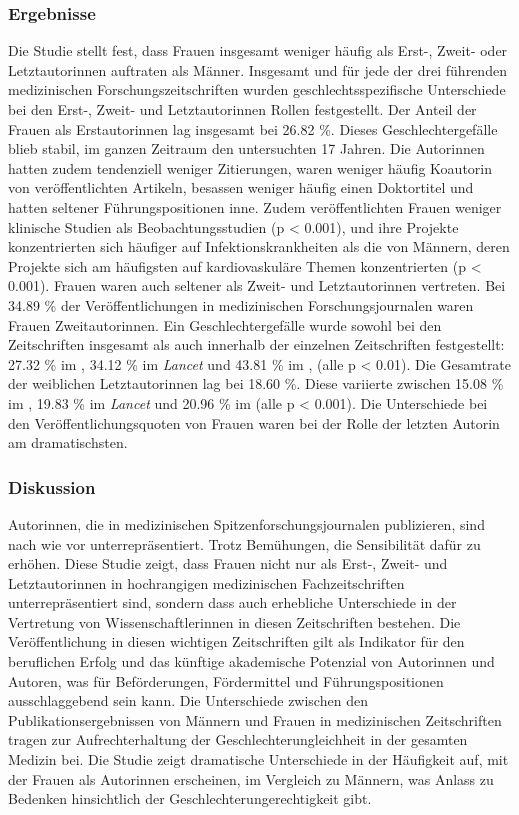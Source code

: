 \subsubsection{Ergebnisse}
Die Studie stellt fest, dass Frauen insgesamt weniger häufig als Erst-, Zweit- oder Letztautorinnen auftraten als Männer. 
Insgesamt und für jede der drei führenden medizinischen Forschungszeitschriften wurden geschlechtsspezifische Unterschiede 
bei den Erst-, Zweit- und Letztautorinnen Rollen festgestellt. 
Der Anteil der Frauen als Erstautorinnen lag insgesamt bei 26.82 \%.
Dieses Geschlechtergefälle blieb stabil, im ganzen Zeitraum den untersuchten 17 Jahren. 
Die Autorinnen hatten zudem tendenziell weniger Zitierungen, waren weniger häufig Koautorin von veröffentlichten Artikeln, 
besassen weniger häufig einen Doktortitel und hatten seltener Führungspositionen inne.
Zudem veröffentlichten Frauen weniger klinische Studien als Beobachtungsstudien (p < 0.001), und ihre Projekte konzentrierten 
sich häufiger auf Infektionskrankheiten als die von Männern, deren Projekte sich am häufigsten auf kardiovaskuläre Themen konzentrierten (p < 0.001).
Frauen waren auch seltener als Zweit- und Letztautorinnen vertreten. 
Bei 34.89 \% der Veröffentlichungen in medizinischen Forschungsjournalen waren Frauen Zweitautorinnen. 
Ein Geschlechtergefälle wurde sowohl bei den Zeitschriften insgesamt als auch innerhalb der einzelnen 
Zeitschriften festgestellt: 27.32 \% im , 34.12 \% im \textsl{Lancet} und 43.81 \% im , (alle p < 0.01).
Die Gesamtrate der weiblichen Letztautorinnen lag bei 18.60 \%.
Diese variierte zwischen 15.08 \% im , 19.83 \% im \textsl{Lancet} und 20.96 \% im  (alle p < 0.001). 
Die Unterschiede bei den Veröffentlichungsquoten von Frauen waren bei der Rolle der letzten Autorin am dramatischsten.


\subsubsection{Diskussion}
Autorinnen, die in medizinischen Spitzenforschungsjournalen publizieren, sind nach wie vor unterrepräsentiert. 
Trotz Bemühungen, die Sensibilität dafür zu erhöhen. 
Diese Studie zeigt, dass Frauen nicht nur als Erst-, Zweit- und Letztautorinnen in hochrangigen medizinischen Fachzeitschriften 
unterrepräsentiert sind, sondern dass auch erhebliche Unterschiede in der Vertretung von Wissenschaftlerinnen in diesen Zeitschriften bestehen. 
Die Veröffentlichung in diesen wichtigen Zeitschriften gilt als Indikator für den beruflichen Erfolg und das künftige akademische Potenzial 
von Autorinnen und Autoren, was für Beförderungen, Fördermittel und Führungspositionen ausschlaggebend sein kann. 
Die Unterschiede zwischen den Publikationsergebnissen von Männern und Frauen in medizinischen Zeitschriften tragen zur 
Aufrechterhaltung der Geschlechterungleichheit in der gesamten Medizin bei. 
Die Studie zeigt dramatische Unterschiede in der Häufigkeit auf, mit der Frauen als Autorinnen erscheinen,
im Vergleich zu Männern, was Anlass zu Bedenken hinsichtlich der Geschlechterungerechtigkeit gibt.
